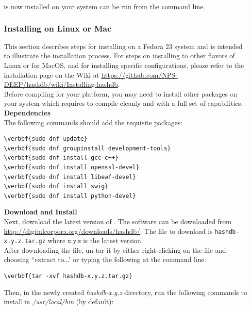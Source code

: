 \documentclass[11pt,fleqn]{article} %
\begin{document}
\hdb is now installed on your system can be run from the command line.\\

\subsubsection{Installing on Linux or Mac}
This section describes steps for installing \hdb on a Fedora 23 system and is intended to illustrate the installation process.  For steps on installing \hdb to other flavors of Linux or for MacOS, and for installing specific configurations, please refer to the installation page on the \hdb Wiki at \url{https://github.com/NPS-DEEP/hashdb/wiki/Installing-hashdb}.\\

Before compiling \hdb for your platform, you may need to install other packages on your system which \hdb requires to compile cleanly and with a full set of capabilities.\\

\textbf{Dependencies}\\
The following commands should add the requisite packages:
\begin{Verbatim}[commandchars=\\\{\}]
\verbbf{sudo dnf update}
\verbbf{sudo dnf groupinstall development-tools}
\verbbf{sudo dnf install gcc-c++}
\verbbf{sudo dnf install openssl-devel}
\verbbf{sudo dnf install libewf-devel}
\verbbf{sudo dnf install swig}
\verbbf{sudo dnf install python-devel}
\end{Verbatim}

\textbf{Download and Install \hdb}\\
Next, download the latest version of \hdb. The software can be downloaded from \url{http://digitalcorpora.org/downloads/hashdb/}. The file to download is \texttt{hashdb-x.y.z.tar.gz} where x.y.z is the latest version.\\

After downloading the file, un-tar it by either right-clicking on the file and choosing ``extract to...' or typing the following at the command line:
\begin{Verbatim}[commandchars=\\\{\}]
\verbbf{tar -xvf hashdb-x.y.z.tar.gz}
\end{Verbatim}

Then, in the newly created \textit{hashdb-x.y.z} directory, run the following commands to install \hdb in \textit{/usr/local/bin} (by default):
\end{document}
